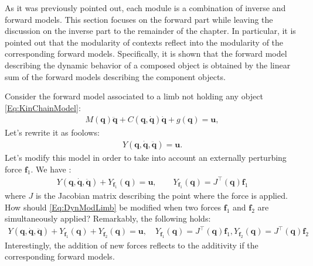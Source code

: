 \documentclass{svmult}
\begin{document}
As it was previously pointed out, each module is a combination
of inverse and forward models. This section focuses on the forward part while
leaving the discussion on the inverse part to the remainder of the chapter. 
In particular, it is pointed out that the modularity of contexts reflect 
into the modularity of the corresponding forward models. Specifically,
it is shown that the forward model describing the dynamic behavior
of a composed object is obtained by the linear sum of the 
forward models describing the component objects.

Consider the forward model associated to a limb not holding 
any object \eqref{Eq:KinChainModel}:
\begin{eqnarray}
M(\mathbf{q}) \ddot{\mathbf{q}} +
C(\mathbf{q},\dot{\mathbf{q}})\dot{\mathbf{q}} + g(\mathbf{q}) =
\mathbf{u},
\end{eqnarray}
Let's rewrite it as foolows:
\begin{eqnarray} \label{Eq:DynModLimb}
Y(\mathbf q, \dot{\mathbf q}, \ddot{\mathbf q}) =
\mathbf u.
\end{eqnarray}
Let's modify this model in order to take into account an 
externally perturbing force $\mathbf f_1$. We have \cite{MurrayLeeSastry}:
\begin{eqnarray} \label{Eq:DynModF}
Y(\mathbf q, \dot{\mathbf q}, \ddot{\mathbf q}) + 
Y_{\mathbf f_1}(\mathbf q) =
\mathbf u, \qquad Y_{\mathbf f_1}(\mathbf q) = J^\top(\mathbf q) \mathbf f_1
\end{eqnarray}
where $J$ is the Jacobian matrix describing the point 
where the force is applied. How should \eqref{Eq:DynModLimb} be modified when 
two forces $\mathbf f_1$ and $\mathbf f_2$ are simultaneously applied? 
Remarkably, the following holds:
\begin{eqnarray} \label{Eq:DynModF2}
Y(\mathbf q, \dot{\mathbf q}, \ddot{\mathbf q}) + 
Y_{\mathbf f_1}(\mathbf q) + 
Y_{\mathbf f_2}(\mathbf q)=
\mathbf u, \quad Y_{\mathbf f_1}(\mathbf q)= J^\top(\mathbf q) \mathbf f_1,
Y_{\mathbf f_2} (\mathbf q) = J^\top(\mathbf q) \mathbf f_2
\end{eqnarray}
Interestingly, the addition of new forces reflects to the additivity 
if the corresponding forward models.
\end{document}
